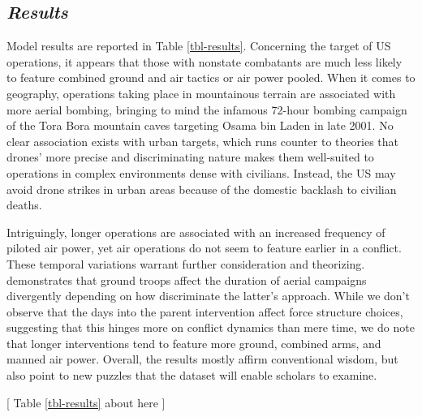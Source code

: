 \documentclass[fleqn,12pt]{article}
\begin{document}
\subsection*{\textit{Results}}
Model results are reported in Table \ref{tbl-results}. Concerning the target of US operations, it appears that those with nonstate combatants are much less likely to feature combined ground and air tactics or air power pooled. When it comes to geography, operations taking place in mountainous terrain are associated with more aerial bombing, bringing to mind the infamous 72-hour bombing campaign of the Tora Bora mountain caves targeting Osama bin Laden in late 2001. No clear association exists with urban targets, which runs counter to theories that drones' more precise and discriminating nature makes them well-suited to operations in complex environments dense with civilians. Instead, the US may avoid drone strikes in urban areas because of the domestic backlash to civilian deaths.

Intriguingly, longer operations are associated with an increased frequency of piloted air power, yet air operations do not seem to feature earlier in a conflict. These temporal variations warrant further consideration and theorizing. \citet{martinezmachain_aircampaignduration_2015} demonstrates that ground troops affect the duration of aerial campaigns divergently depending on how discriminate the latter's approach. While we don't observe that the days into the parent intervention affect force structure choices, suggesting that this hinges more on conflict dynamics than mere time, we do note that longer interventions tend to feature more ground, combined arms, and manned air power. Overall, the results mostly affirm conventional wisdom, but also point to new puzzles that the dataset will enable scholars to examine.

\begin{center}
	[ Table \ref{tbl-results} about here ]
\end{center}
\end{document}
